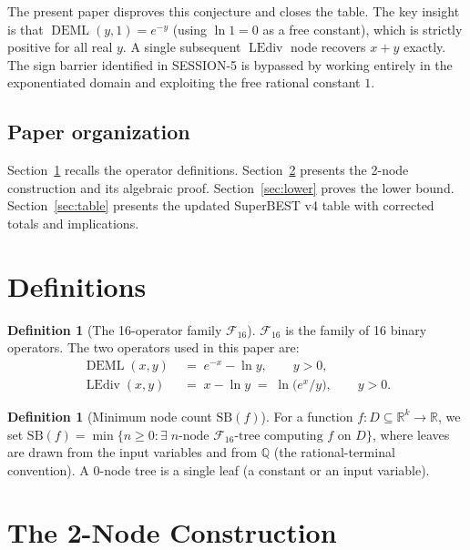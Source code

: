\documentclass[12pt,a4paper]{article}
\theoremstyle{definition}
\newtheorem{definition}[theorem]{Definition}
\newcommand{\DEML}{\operatorname{DEML}}
\newcommand{\LEdiv}{\operatorname{LEdiv}}
\newcommand{\SB}{\mathrm{SB}}
\newcommand{\F}{\mathcal{F}_{16}}
\newcommand{\R}{\mathbb{R}}
\begin{document}
The present paper disproves this conjecture and closes the table.
The key insight is that $\DEML(y, 1) = e^{-y}$ (using $\ln 1 = 0$ as a
free constant), which is strictly positive for all real $y$.
A single subsequent $\LEdiv$ node recovers $x+y$ exactly.
The sign barrier identified in SESSION-5 is bypassed by working entirely in
the exponentiated domain and exploiting the free rational constant $1$.

\subsection*{Paper organization}
Section~\ref{sec:def} recalls the operator definitions.
Section~\ref{sec:construction} presents the 2-node construction and its
algebraic proof.
Section~\ref{sec:lower} proves the lower bound.
Section~\ref{sec:table} presents the updated SuperBEST v4 table with
corrected totals and implications.

\section{Definitions}
\label{sec:def}

\begin{definition}[The 16-operator family $\F$]
\label{def:F16}
$\F$ is the family of 16 binary operators.
The two operators used in this paper are:
\begin{align*}
  \DEML(x, y) &\;=\; e^{-x} - \ln y, \qquad y > 0, \\
  \LEdiv(x, y) &\;=\; x - \ln y
                 \;=\; \ln\!\bigl(e^x / y\bigr), \qquad y > 0.
\end{align*}
\end{definition}

\begin{definition}[Minimum node count $\SB(f)$]
\label{def:SB}
For a function $f \colon D \subseteq \R^k \to \R$, we set
$\SB(f) = \min\{n \ge 0 : \exists\;\text{$n$-node $\F$-tree computing $f$ on $D$}\}$,
where leaves are drawn from the input variables and from $\mathbb{Q}$
(the rational-terminal convention).
A 0-node tree is a single leaf (a constant or an input variable).
\end{definition}

\section{The 2-Node Construction}
\label{sec:construction}
\end{document}
